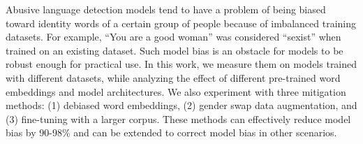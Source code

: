 Abusive language detection models tend to have a problem of being biased toward identity words of a certain group of people because of imbalanced training datasets. For example, ``You are a good woman'' was considered ``sexist'' when trained on an existing dataset. Such model bias is an obstacle for models to be robust enough for practical use. In this work, we measure them on models trained with different datasets, while analyzing the effect of different pre-trained word embeddings and model architectures. We also experiment with three mitigation methods: (1) debiased word embeddings, (2) gender swap data augmentation, and (3) fine-tuning with a larger corpus. These methods can effectively reduce model bias by 90-98\% and can be extended to correct model bias in other scenarios.
